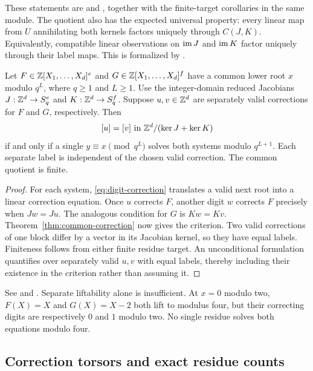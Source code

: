 These statements are
 and
, together with the
finite-target corollaries in the same module. The quotient also has the
expected universal property: every linear map from $U$ annihilating both
kernels factors uniquely through $C(J,K)$. Equivalently, compatible linear
observations on $\operatorname{im} J$ and $\operatorname{im} K$ factor uniquely through their label
maps. This is formalized by
.

\begin{corollary}\label{cor:shared-polynomial}
Let $F\in\mathbb Z[X_1,\ldots,X_d]^e$ and
$G\in\mathbb Z[X_1,\ldots,X_d]^f$ have a common lower root $x$ modulo $q^L$,
where $q\ge1$ and $L\ge1$. Use the integer-domain reduced Jacobians
$J:\mathbb Z^d\to S_q^e$ and $K:\mathbb Z^d\to S_q^f$. Suppose $u,v\in\mathbb Z^d$ are
separately valid corrections for $F$ and $G$, respectively. Then
\[
 [u]=[v]\text{ in }\mathbb Z^d/(\ker J+\ker K)
\]
if and only if a single $y\equiv x\pmod{q^L}$ solves both systems modulo
$q^{L+1}$. Each separate label is independent of the chosen valid
correction. The common quotient is finite.
\end{corollary}

\begin{proof}
For each system, \eqref{eq:digit-correction} translates a valid next root
into a linear correction equation. Once $u$ corrects $F$, another digit
$w$ corrects $F$ precisely when $Jw=Ju$. The analogous condition for $G$
is $Kw=Kv$. Theorem~\ref{thm:common-correction} now gives the criterion.
Two valid corrections of one block differ by a vector in its Jacobian
kernel, so they have equal labels. Finiteness follows from either finite
residue target. An unconditional formulation quantifies over separately
valid $u,v$ with equal labels, thereby including their existence in the
criterion rather than assuming it.
\end{proof}

See  and
.
Separate liftability alone is insufficient. At $x=0$ modulo two,
$F(X)=X$ and $G(X)=X-2$ both lift to modulus four, but their correcting
digits are respectively $0$ and $1$ modulo two. No single residue solves
both equations modulo four.

\subsection{Correction torsors and exact residue counts}

